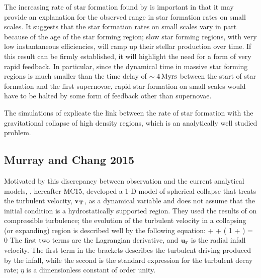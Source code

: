 \documentclass[../dissertation.tex]{subfiles}
\begin{document}
The increasing rate of star formation found by \citet{2015ApJ...800...49L} is important 
in that it may provide an explanation for the observed range in star formation rates on 
small scales.  It suggests that the star formation rates on small scales 
vary in part because of the age of the star forming region; slow star forming 
regions, with very low instantaneous efficiencies, will ramp up their stellar production over time. If this result
can be firmly established, it will highlight the need for a form of very rapid 
feedback. In particular, since the dynamical time in massive star forming regions 
is much smaller than the time delay of $\sim 4{\,\rm Myrs}$ between the start of star 
formation and the first supernovae, rapid star formation on small scales would 
have to be halted by some form of feedback other than supernovae. 

The simulations of  \citet{2015ApJ...800...49L} explicate the link between the rate of star formation with the gravitational collapse of high density regions, which  is  an analytically well studied problem. 

\subsection{Murray and Chang 2015} \label{MC15_model}

Motivated by this discrepancy between observation and the current analytical models,
\citet{2015ApJ...804...44M}, hereafter MC15, developed a 1-D model of
spherical collapse that treats the turbulent velocity, $\mathbf{v_T}$, as a dynamical variable and
does not assume that the initial condition is a hydrostatically supported region. 
They used the results of \citet{2012ApJ...750L..31R} on compressible turbulence; the evolution 
of the turbulent velocity in a collapsing (or expanding) region is described well by the following equation:
%
\be
{} + \ur {} 
+ \left( 1 + \eta \frac{\vt}{\ur} \right)  = 0
\label{eq:hydro_Robertson}
\ee
%
The first two terms are the Lagrangian derivative, and $\mathbf{u_r}$ is the radial infall velocity. The first term in the brackets 
describes the turbulent driving produced by the infall, while the second 
is the standard expression for the turbulent decay rate;  $\eta$ is a dimensionless constant of order unity.
\end{document}
